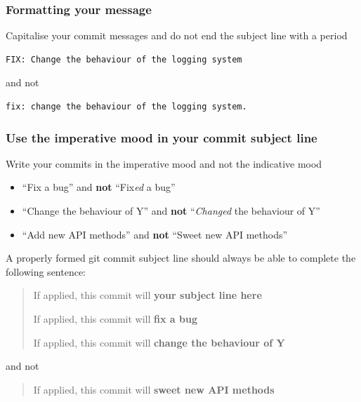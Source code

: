 \documentclass[12pt,a4paper,]{article}
\providecommand{\tightlist}{%
  \setlength{\itemsep}{0pt}\setlength{\parskip}{0pt}}
\begin{document}
\hypertarget{formatting-your-message}{\subsubsection{Formatting your
message}\label{formatting-your-message}}

Capitalise your commit messages and do not end the subject line with a
period

\begin{verbatim}
FIX: Change the behaviour of the logging system
\end{verbatim}

and not

\begin{verbatim}
fix: change the behaviour of the logging system.
\end{verbatim}

\hypertarget{use-the-imperative-mood-in-your-commit-subject-line}{\subsubsection{Use
the imperative mood in your commit subject
line}\label{use-the-imperative-mood-in-your-commit-subject-line}}

Write your commits in the imperative mood and not the indicative mood

\begin{itemize}
\tightlist
\item
  ``Fix a bug'' and \textbf{not} ``Fix\emph{ed} a bug''
\item
  ``Change the behaviour of Y'' and \textbf{not} ``\emph{Changed} the
  behaviour of Y''
\item
  ``Add new API methods'' and \textbf{not} ``Sweet new API methods''
\end{itemize}

A properly formed git commit subject line should always be able to
complete the following sentence:

\begin{quote}
If applied, this commit will \textbf{your subject line here}

If applied, this commit will \textbf{fix a bug}

If applied, this commit will \textbf{change the behaviour of Y}
\end{quote}

and not

\begin{quote}
If applied, this commit will \textbf{sweet new API methods}
\end{quote}
\end{document}
